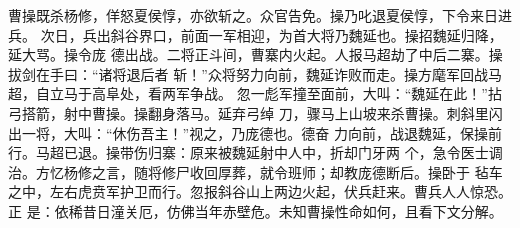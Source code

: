 曹操既杀杨修，佯怒夏侯惇，亦欲斩之。众官告免。操乃叱退夏侯惇，下令来日进兵。
次日，兵出斜谷界口，前面一军相迎，为首大将乃魏延也。操招魏延归降，延大骂。操令庞
德出战。二将正斗间，曹寨内火起。人报马超劫了中后二寨。操拔剑在手曰：“诸将退后者
斩！”众将努力向前，魏延诈败而走。操方麾军回战马超，自立马于高阜处，看两军争战。
忽一彪军撞至面前，大叫：“魏延在此！”拈弓搭箭，射中曹操。操翻身落马。延弃弓绰
刀，骤马上山坡来杀曹操。刺斜里闪出一将，大叫：“休伤吾主！”视之，乃庞德也。德奋
力向前，战退魏延，保操前行。马超已退。操带伤归寨：原来被魏延射中人中，折却门牙两
个，急令医士调治。方忆杨修之言，随将修尸收回厚葬，就令班师；却教庞德断后。操卧于
毡车之中，左右虎贲军护卫而行。忽报斜谷山上两边火起，伏兵赶来。曹兵人人惊恐。正
是：依稀昔日潼关厄，仿佛当年赤壁危。未知曹操性命如何，且看下文分解。